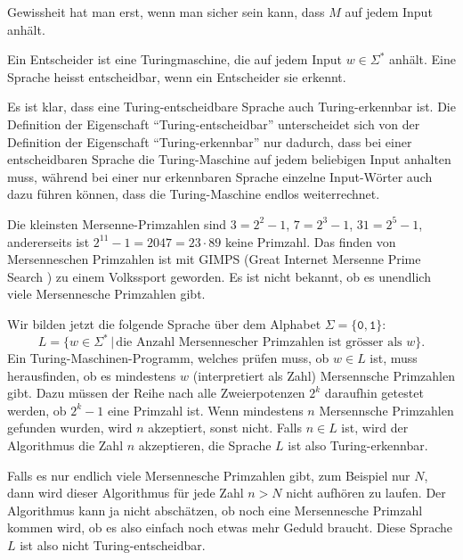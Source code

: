Gewissheit hat man erst, wenn man sicher sein kann, dass $M$ auf
jedem Input anhält.

\begin{definition}
Ein Entscheider ist eine Turingmaschine, die auf jedem Input $w\in\Sigma^*$
anhält. Eine Sprache heisst entscheidbar, wenn ein Entscheider sie
erkennt.
\end{definition}
Es ist klar, dass eine Turing-entscheidbare Sprache auch Turing-erkennbar
ist.
Die Definition der Eigenschaft ``Turing-entscheidbar'' unterscheidet sich
von der Definition der Eigenschaft ``Turing-erkennbar'' nur dadurch,
dass bei einer entscheidbaren Sprache die Turing-Maschine auf jedem
beliebigen Input anhalten muss, während bei einer nur erkennbaren
Sprache einzelne Input-Wörter auch dazu führen können, dass die
Turing-Maschine endlos weiterrechnet.

\begin{beispiel}
Die kleinsten Mersenne-Primzahlen sind $3=2^2-1$, $7=2^3-1$, $31=2^5-1$,
andererseits ist $2^{11}-1=2047=23\cdot 89$ keine Primzahl.
Das finden von Mersenneschen Primzahlen ist mit GIMPS (Great Internet
Mersenne Prime Search \cite{skript:gimps}) zu einem Volkssport geworden.
Es ist nicht bekannt, ob es unendlich viele Mersennesche Primzahlen gibt.

Wir bilden jetzt die folgende Sprache über dem Alphabet
$\Sigma=\{\texttt{0},\texttt{1}\}$:
\[
L=\{w\in\Sigma^*\,|\,\text{die Anzahl Mersennescher Primzahlen ist grösser als $w$}\}.
\]
Ein Turing-Maschinen-Programm, welches prüfen muss, ob $w\in L$ ist,
muss herausfinden, ob es mindestens $w$ (interpretiert als Zahl)
Mersennsche Primzahlen gibt.
Dazu müssen der Reihe nach alle Zweierpotenzen $2^k$ daraufhin getestet werden,
ob $2^k-1$ eine Primzahl ist.
Wenn mindestens $n$ Mersennsche Primzahlen gefunden wurden, wird $n$
akzeptiert, sonst nicht. Falls $n\in L$ ist, wird der Algorithmus
die Zahl $n$ akzeptieren, die Sprache $L$ ist also Turing-erkennbar.

Falls es nur endlich viele Mersennesche Primzahlen gibt, zum Beispiel
nur $N$, dann wird dieser Algorithmus für jede Zahl $n>N$ nicht
aufhören zu laufen.
Der Algorithmus kann ja nicht abschätzen, ob noch eine Mersennesche
Primzahl kommen wird, ob es also einfach noch etwas mehr Geduld
braucht.
Diese Sprache $L$ ist also nicht Turing-entscheidbar.
\end{beispiel}

